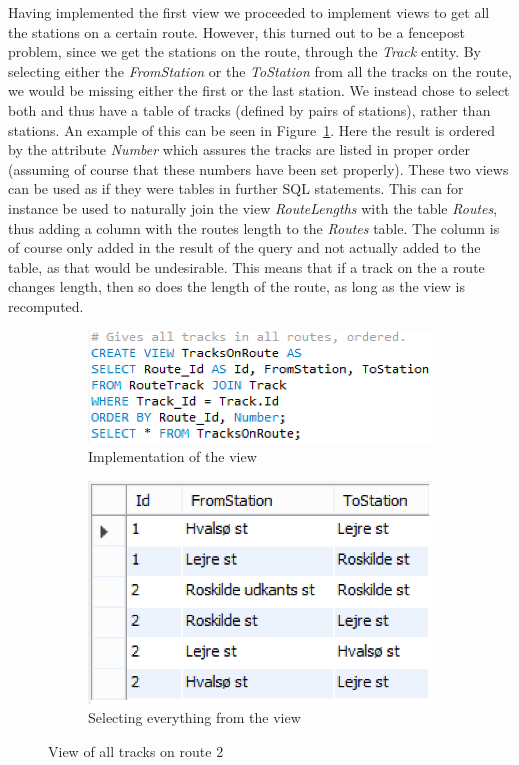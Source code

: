 Having implemented the first view we proceeded to implement views to get all 
the stations on a certain route. However, this turned out to be a fencepost 
problem, since we get the stations on the route, through the \emph{Track} 
entity. By selecting either the \emph{FromStation} or the \emph{ToStation} from 
all the tracks on the route, we would be missing either the first or the last 
station. We instead chose to select both and thus have a table of tracks 
(defined by pairs of stations), rather than stations. An example of this can be 
seen in Figure~\ref{fig:route}. Here the result is ordered by the attribute 
\emph{Number} which assures the tracks are listed in proper order (assuming of 
course that these numbers have been set properly). These two views can be used 
as if they were tables in further SQL statements. This can for instance be used 
to naturally join the view \emph{RouteLengths} with the table \emph{Routes}, 
thus adding a column with the routes length to the \emph{Routes} table. The 
column is of course only added in the result of the query and not actually 
added to the table, as that would be undesirable. This means that if a track on 
the a route changes length, then so does the length of the route, as long as 
the view is recomputed.


\begin{figure}[h]
    \centering
    \begin{subfigure}[b]{0.45 \textwidth}
        \centering
        \includegraphics[width=\textwidth]{img/TracksOnRoute}
        \caption{Implementation of the view}
    \end{subfigure}
    \begin{subfigure}[b]{0.45 \textwidth}
        \centering
        \includegraphics{img/RouteView}
        \caption{Selecting everything from the view}
    \end{subfigure}
    \caption{View of all tracks on route 2}
    \label{fig:route}
\end{figure}

